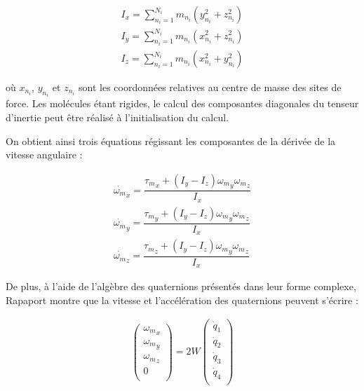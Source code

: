 \documentclass[12pt]{article}
\begin{document}
\begin{eqnarray} \label{eqn:inertie}
I_x=\sum_{n_i=1}^{N_i}m_{n_i}\left(y_{n_i}^2+z_{n_i}^2\right) \nonumber \\
I_y=\sum_{n_i=1}^{N_i}m_{n_i}\left(x_{n_i}^2+z_{n_i}^2\right) \\
I_z=\sum_{n_i=1}^{N_i}m_{n_i}\left(x_{n_i}^2+y_{n_i}^2\right) \nonumber
\end{eqnarray}

où $x_{n_i}$, $y_{n_i}$ et $z_{n_i}$ sont les coordonnées relatives au centre de masse des sites de force. Les molécules étant rigides, le calcul des composantes diagonales du tenseur d'inertie peut être réalisé à l'initialisation du calcul.

On obtient ainsi trois équations régissant les composantes de la dérivée de la vitesse angulaire :

\begin{eqnarray} \label{eqn:omegapt}
\dot{\omega_m}_x=\dfrac{{\tau_m}_x +\left(I_y-I_z\right){\omega_m}_y {\omega_m}_z}{I_x} \nonumber \\
\dot{\omega_m}_y=\dfrac{{\tau_m}_y +\left(I_y-I_z\right){\omega_m}_y{\omega_m}_z}{I_x} \\
\dot{\omega_m}_z=\dfrac{{\tau_m}_z +\left(I_y-I_z\right){\omega_m}_y {\omega_m}_z}{I_x} \nonumber
\end{eqnarray}

De plus, à l'aide de l'algèbre des quaternions présentés dans leur forme complexe, Rapaport \cite{rapaport} montre que la vitesse et l'accélération des quaternions peuvent s'écrire :

\begin{eqnarray} \label{eqn:omega}
\begin{pmatrix}
{\omega_m}_x \\ {\omega_m}_y \\ {\omega_m}_z \\ 0 \\
\end{pmatrix}
= 2 W \begin{pmatrix}
\dot{q}_1 \\ \dot{q}_2 \\ \dot{q}_3 \\ \dot{q}_4 \\
\end{pmatrix}
\end{eqnarray}
\end{document}
